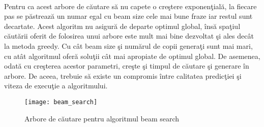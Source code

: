 \paragraph{}
Pentru ca acest arbore de c\u autare s\u a nu capete o cre\c stere exponen\c tial\u a, la fiecare pas se p\u astreaz\u a un numar egal cu beam size cele mai bune fraze iar restul sunt decartate. Acest algoritm nu asigur\u a de departe optimul global, \^ ins\u a spa\c tiul c\u aut\u arii oferit de folosirea unui arbore este mult mai bine dezvoltat \c si ales dec\^ at la metoda greedy. Cu c\^ at beam size \c si num\u arul de copii genera\c ti sunt mai mari, cu at\^ at algoritmul ofer\u a solu\c tii c\^ at mai apropiate de optimul global. De asemenea, odat\u a cu cre\c sterea acestor parametri, cre\c ste \c si timpul de c\u autare \c si generare \^ in arbore. De aceea, trebuie s\u a existe un compromis \^ intre calitatea predic\c tiei \c si viteza de execu\c tie a algoritmului.

\begin{figure}[H]
\centering
\texttt{[image: beam\_search]}
\caption{Arbore de c\u autare pentru algoritmul beam search}
\end{figure}